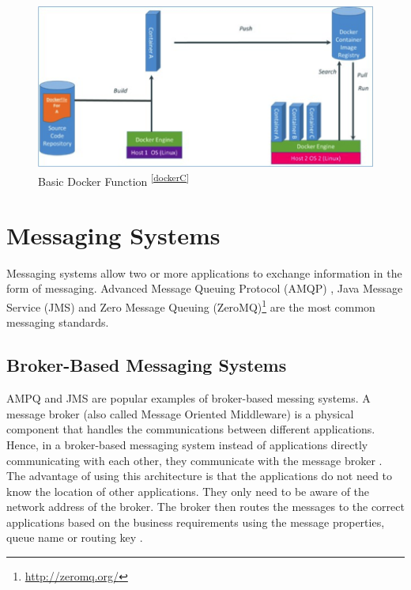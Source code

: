 \documentclass[a4paper,11pt,twoside]{report}
\begin{document}
\begin{figure}[!ht]
  \centering
     \includegraphics[scale=1]{docker}
  \caption{Basic Docker Function \textsuperscript{\ref{dockerC}}} %
  \label{docker}
\end{figure}
\vspace{-18pt}


\noindent
\section{Messaging Systems} \label{MOM}
Messaging systems allow two or more applications to exchange information in the form of messaging. Advanced Message Queuing Protocol (AMQP) \cite{AMPQ}, Java Message Service (JMS) \cite{JMS} and Zero Message Queuing (ZeroMQ)\footnote{\label{ZeroMQ_1} \url{http://zeromq.org/}} are the most common messaging standards. 

\subsection{Broker-Based Messaging Systems} 
AMPQ and JMS are popular examples of broker-based messing systems. A message broker (also called Message Oriented Middleware) is a physical component that handles the communications between different applications. Hence, in a broker-based messaging system instead of applications directly communicating with each other, they communicate with the message broker \cite{broker}. The advantage of using this architecture is that the applications do not need to know the location of other applications. They only need to be aware of the network address of the broker. The broker then routes the messages to the correct applications based on the business requirements using the message properties, queue name or routing key \cite{AMPQ}. 
\end{document}
